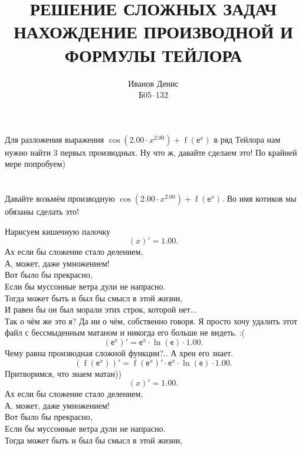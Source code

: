 \documentclass[a4paper,oneside,final,12pt,russian]{extarticle}
\title{\normalsize \bf РЕШЕНИЕ СЛОЖНЫХ ЗАДАЧ \\ НАХОЖДЕНИЕ ПРОИЗВОДНОЙ И ФОРМУЛЫ ТЕЙЛОРА}
\author{\small Иванов Денис \\ Б05--132}
\newcommand{\e}{\mathsf{e}}
\begin{document}
\maketitle

Для разложения выражения $\operatorname{cos}(2.00 \cdot x ^{2.00 } ) + \operatorname{f}(\e ^{x } ) $ в ряд Тейлора нам нужно найти $3$ первых производных. Ну что ж, давайте сделаем это!
По крайней мере попробуем)

\section{}
Давайте возьмём производную $\operatorname{cos}(2.00 \cdot x ^{2.00 } ) + \operatorname{f}(\e ^{x } ) $. Во имя котиков мы обязаны сделать это!

Нарисуем кишечную палочку
\begin{dmath*}
(x )' = 1.00 .
\end{dmath*}
Ах если бы сложение стало делением, \\ 
А, может, даже умножением! \\ 
Вот было бы прекрасно,\\ 
Если бы муссонные ветра дули не напрасно. \\ 
Тогда может быть и был бы смысл в этой жизни,\\ 
И равен бы он был морали этих строк, которой нет...\\ 
Так о чём же это я? Да ни о чём, собственно говоря.
Я просто хочу удалить этот файл с бессмыденным матаном 
и никогда его больше не видеть. :(
\begin{dmath*}
(\e ^{x } )' = \e ^{x } \cdot \operatorname{ln}(\e ) \cdot 1.00 .
\end{dmath*}
Чему равна производная сложной функции?.. А хрен его знает.
\begin{dmath*}
(\operatorname{f}(\e ^{x } ) )' = \operatorname{f}(\e ^{x } ) '\cdot \e ^{x } \cdot \operatorname{ln}(\e ) \cdot 1.00 .
\end{dmath*}
Притворимся, что знаем матан))
\begin{dmath*}
(x )' = 1.00 .
\end{dmath*}
Ах если бы сложение стало делением, \\ 
А, может, даже умножением! \\ 
Вот было бы прекрасно,\\ 
Если бы муссонные ветра дули не напрасно. \\ 
Тогда может быть и был бы смысл в этой жизни,\\ 
\end{document}
